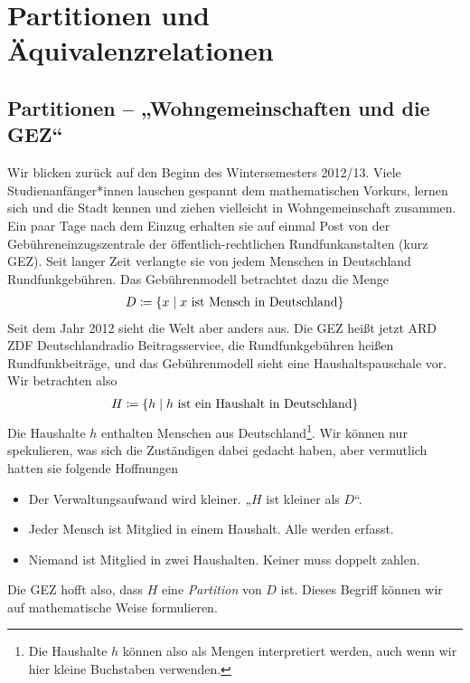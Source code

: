 \section{Partitionen und Äquivalenzrelationen}

\subsection{Partitionen -- „Wohngemeinschaften und die GEZ“}

Wir blicken zurück auf den Beginn des Wintersemesters 2012/13. Viele
Studienanfänger*innen lauschen gespannt dem mathematischen Vorkurs, lernen
sich und die Stadt kennen und ziehen vielleicht in Wohngemeinschaft
zusammen. Ein paar Tage nach dem Einzug erhalten sie auf einmal Post von
der Gebühreneinzugszentrale der öffentlich-rechtlichen Rundfunkanstalten
(kurz GEZ). Seit langer Zeit verlangte sie von jedem Menschen in
Deutschland Rundfunkgebühren. Das Gebührenmodell betrachtet dazu die Menge
\begin{align*}
  D \coloneqq \{ x \mid x \text{ ist Mensch in Deutschland} \}
\end{align*}
Seit dem Jahr 2012 sieht die Welt aber anders aus. Die GEZ heißt jetzt ARD
ZDF Deutschlandradio Beitragsservice, die Rundfunkgebühren heißen
Rundfunkbeiträge, und das Gebührenmodell sieht eine Haushaltspauschale
vor. Wir betrachten also
\begin{align*}
  H \coloneqq \{ h \mid h \text{ ist ein Haushalt in Deutschland} \}
\end{align*}
Die Haushalte $h$ enthalten Menschen aus Deutschland\footnote{Die Haushalte
  $h$ können also als Mengen interpretiert werden, auch wenn wir hier
  kleine Buchstaben verwenden.}. Wir können nur spekulieren, was sich die
Zuständigen dabei gedacht haben, aber vermutlich hatten sie folgende
Hoffnungen

\begin{itemize}
  \item Der Verwaltungsaufwand wird kleiner. „$H$ ist kleiner als $D$“.
  \item Jeder Mensch ist Mitglied in einem Haushalt. Alle werden erfasst.
  \item Niemand ist Mitglied in zwei Haushalten. Keiner muss doppelt zahlen.
\end{itemize}

Die GEZ hofft also, dass $H$ eine \emph{Partition} von $D$ ist. Dieses
Begriff können wir auf mathematische Weise formulieren.

